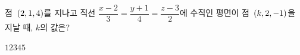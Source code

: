 점~$(2{,}\mkern3mu\mathopen{}1{,}\mkern3mu\mathopen{}4)$를 지나고 직선 $\dfrac{x-2}{3}=\dfrac{y+1}{4}=\dfrac{z-3}{2}$에 수직인 평면이 점~$(k{,}\mkern3mu\mathopen{}2{,}\mkern3mu\mathopen{}-1)$을 지날 때, $k$의 값은?
\begin{choices32}{$1$}{$2$}{$3$}{$4$}{$5$}\end{choices32}
